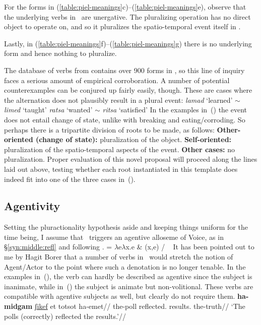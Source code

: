 For the forms in (\ref{table:piel-meanings}c)--(\ref{table:piel-meanings}e), observe that the underlying verbs in \tkal~are unergative. The pluralizing operation has no direct object to operate on, and so it pluralizes the spatio-temporal event itself in \tpie.

Lastly, in (\ref{table:piel-meanings}f)--(\ref{table:piel-meanings}g) there is no underlying form and hence nothing to pluralize.

The database of verbs from \cite{ehrenfeld12} contains over 900 forms in \tpie, so this line of inquiry faces a serious amount of empirical corroboration. A number of potential counterexamples can be conjured up fairly easily, though. These are cases where the alternation does not plausibly result in a plural event:
\pex
	\a \emph{lamad} `learned' $\sim$ \emph{limed} `taught'
	\a \emph{ratsa} `wanted' $\sim$ \emph{ritsa} `satisfied'
\xe
In the examples in~(\lastx) the event does not entail change of state, unlike with breaking and eating/corroding. So perhaps there is a tripartite division of roots to be made, as follows:
\pex
	\a \textbf{Other-oriented (change of state):} pluralization of the object.
	\a \textbf{Self-oriented:} pluralization of the spatio-temporal aspects of the event.
	\a \textbf{Other cases:} no pluralization.
\xe
Proper evaluation of this novel proposal will proceed along the lines laid out above, testing whether each root instantiated in this template does indeed fit into one of the three cases in~(\lastx).

	\subsection{Agentivity}
Setting the pluractionality hypothesis aside and keeping things uniform for the time being, I assume that \va~triggers an agentive alloseme of Voice, as in \S\ref{syn:middle:refl} and following \cite{doron03,doron14adj}.
\ex {} = $\lambda$e$\lambda$x.e \& (x,e) / \trace~\va
\xe
It has been pointed out to me by Hagit Borer that a number of verbs in \tpie~would stretch the notion of Agent/Actor to the point where such a denotation is no longer tenable. In the examples in~(\nextx), the verb can hardly be described as agentive since the subject is inanimate, while in~(\anextx) the subject is animate but non-volitional. These verbs are compatible with agentive subjects as well, but clearly do not require them.
\pex
  \a \begingl
    \gla \textbf{ha-midgam} \underline{ʃikef} et totsot ha-emet//
    \glb the-poll reflected.  results. the-truth//
    \glft `The polls (correctly) reflected the results.'//
  \endgl
    
